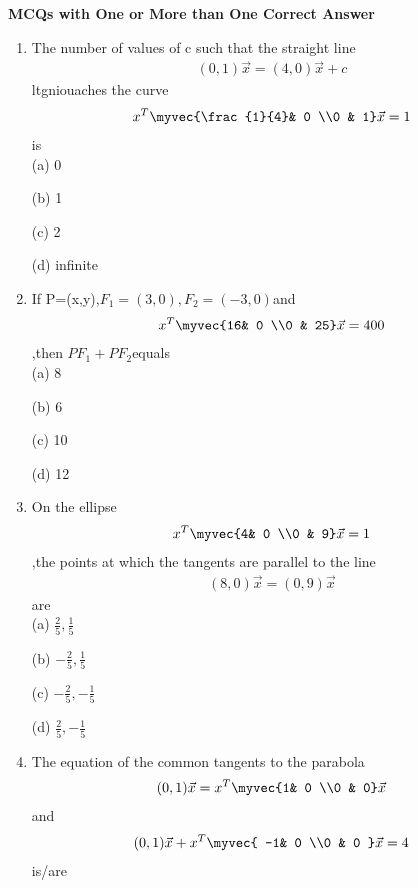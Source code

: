 {\Large\textbf{MCQs with One or More than One Correct Answer }}
\begin{enumerate}

\item The number of values of c such that the straight line \begin{align}(0,1)\vec x=(4,0)\vec x+c\end{align}ltgniouaches the curve \begin{align}x^T\myvec {\frac{1}{4}& 0 \\0 & 1} \vec x=1\end{align}is \\
    
    \choice (a) 0
    
    \choice (b) 1
    
    \choice (c) 2
    
    \choice (d) infinite\\
    
    \item If P=(x,y),$F_1=(3,0),F_2=(-3,0)$and \begin{align}x^T\myvec{16& 0 \\0 & 25}\vec x=400\end{align},then $PF_1+PF_2$equals \\
    
    \choice (a) 8
     
    \choice (b) 6
    
    \choice (c) 10
    
    \choice (d) 12\\
    
    \item On the ellipse \begin{align} x^T\myvec{4& 0 \\0 & 9} \vec x=1\end{align},the points at which the tangents are parallel to the line \begin{align}(8,0)\vec x=(0,9)\vec x\end{align} are \\
    
     \choice (a) $\frac{2}{5},\frac{1}{5}$
     
     \choice (b) $-\frac{2}{5},\frac{1}{5}$
     
     \choice (c) $-\frac{2}{5},-\frac{1}{5}$
     
     \choice (d) $\frac{2}{5},-\frac{1}{5}$\\
     
     \item The equation of the common tangents to the parabola \begin{align}(0,1)\vec x= x^T\myvec{1& 0 \\0 & 0}\vec x\end{align} and \begin{align}(0,1)\vec x+x^T\myvec{
    -1& 0 \\0 & 0 }\vec x=4\end{align} is/are \\
    

\end{enumerate}
